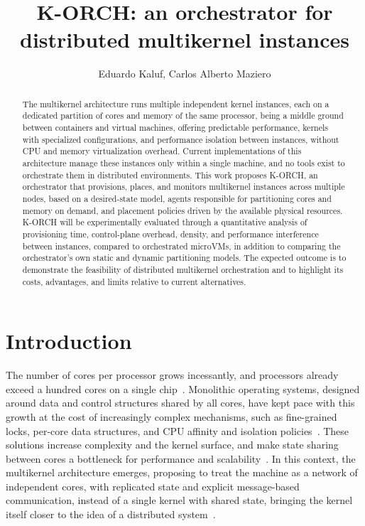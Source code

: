 \documentclass[12pt]{article}
\title{K-ORCH: an orchestrator for distributed multikernel instances}
\author{Eduardo Kaluf\inst{1}, Carlos Alberto Maziero\inst{2}}
\begin{document}
\maketitle

\begin{abstract}
  The multikernel architecture runs multiple independent kernel instances, each on a dedicated partition of cores and memory of
  the same processor, being a middle ground between containers and virtual machines, offering predictable
  performance, kernels with specialized configurations, and performance isolation between instances, without CPU and
  memory virtualization overhead.
  Current implementations of this architecture
  manage these instances only within a single machine, and no tools exist to orchestrate them in distributed environments.
  This work proposes K-ORCH, an orchestrator that provisions, places, and monitors multikernel instances across
  multiple nodes, based on a desired-state model, agents responsible for partitioning cores and memory on demand,
  and placement policies driven by the available physical resources.
  K-ORCH will be experimentally evaluated through a quantitative analysis of provisioning time, control-plane overhead,
  density, and performance interference between instances, compared to orchestrated microVMs, in addition to comparing
  the orchestrator's own static and dynamic partitioning models.
  The expected outcome is to demonstrate the feasibility of distributed multikernel orchestration and to highlight its
  costs, advantages, and limits relative to current alternatives.
\end{abstract}

\section{Introduction} \label{sec:introducao}
The number of cores per processor grows incessantly, and processors already exceed a hundred cores on a single chip~\cite{amd2024epyc}.
Monolithic operating systems, designed around data and control structures shared by all cores, have kept pace with this growth
at the cost of increasingly complex mechanisms, such as fine-grained locks, per-core data structures, and CPU affinity and
isolation policies~\cite{boydwickizer2010mosbench}.
These solutions increase complexity and the kernel surface, and make state sharing between cores a bottleneck for
performance and scalability~\cite{boydwickizer2008corey}.
In this context, the multikernel architecture emerges, proposing to treat the machine as a network of independent cores,
with replicated state and explicit message-based communication, instead of a single kernel with shared
state, bringing the kernel itself closer to the idea of a distributed system~\cite{baumann2009multikernel,wentzlaff2009fos}.
\end{document}
